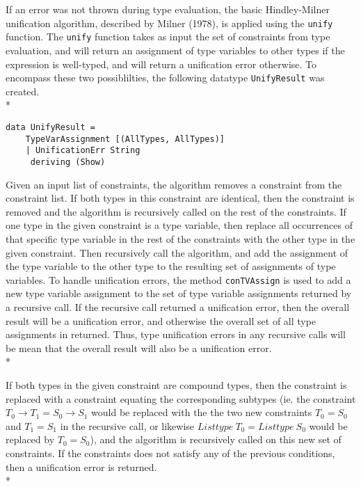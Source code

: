 \documentclass[11pt]{article}
\begin{document}
If an error was not thrown during type evaluation, the basic Hindley-Milner unification algorithm, described by Milner (1978), is applied using the \verb|unify| function. The \verb|unify| function takes as input the set of constraints from type evaluation, and will return an assignment of type variables to other types if the expression is well-typed, and will return a unification error otherwise.  To encompass these two possiblilties, the following datatype \verb|UnifyResult| was created.\\*

\begin{verbatim}
data UnifyResult = 
    TypeVarAssignment [(AllTypes, AllTypes)]
    | UnificationErr String
     deriving (Show)
\end{verbatim}


Given an input list of constraints, the algorithm removes a constraint from the constraint list.
If both types in this constraint are identical, then the constraint is removed and the algorithm is recursively called on the rest of the constraints. 
If one type in the given constraint is a type variable, then replace all occurrences of that specific type variable in the rest of the constraints with the other type in the given constraint. Then recursively call the algorithm, and add the assignment of the type variable to the other type to the resulting set of assignments of type variables. 
To handle unification errors, the method \verb|conTVAssign| is used to add a new type variable assignment to the set of type variable assignments returned by a recursive call. If the recursive call returned a unification error, then the overall result will be a unification error, and otherwise the overall set of all type assignments in returned.  Thus, type unification errors in any recursive calls will be mean that the overall result will also be a unification error.\\*

If both types in the given constraint are compound types, then the constraint is replaced with a constraint equating the corresponding subtypes (ie. the constraint $T_{0} \rightarrow T_{1} = S_{0} \rightarrow S_{1}$ would be replaced with the the two new constraints $T_{0} = S_{0}$ and $T_{1} = S_{1}$ in the recursive call, or likewise $Listtype\ T_{0} = Listtype\ S_{0}$ would be replaced by $T_{0} = S_{0}$), and the algorithm is recursively called on this new set of constraints.  If the constraints does not satisfy any of the previous conditions, then a unification error is returned. \\*
\end{document}
